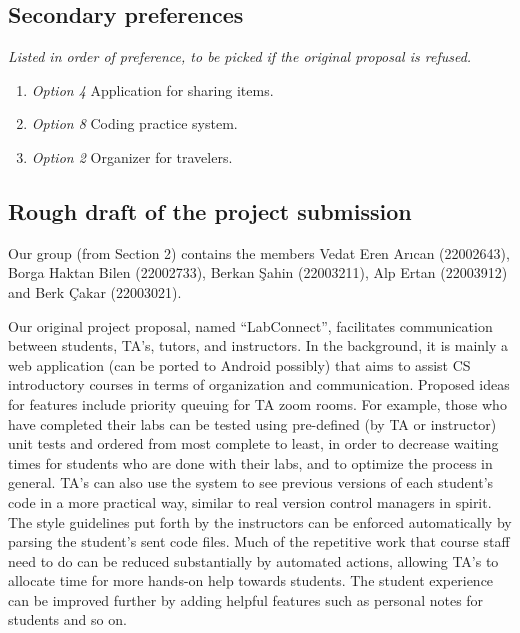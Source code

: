 \documentclass[12pt]{article}
\begin{document}
    \subsection*{Secondary preferences}\label{secondary-preferences}
    
    \textit{Listed in order of preference, to be picked if the original
    proposal is refused.}
    
    \begin{enumerate}
        \itemsep1pt\parskip0pt
        \item \textit{Option 4} \rightarrow \textnormal{Application for sharing items.}\)
        \item \textit{Option 8} \rightarrow \textnormal{Coding practice system.}\)
        \item \textit{Option 2} \rightarrow \textnormal{Organizer for travelers.}\)
    \end{enumerate}
    
    \subsection*{Rough draft of the project
    submission}\label{rough-draft-of-the-project-submission}
    
    Our group (from Section 2) contains the members Vedat Eren Arıcan
    (22002643), Borga Haktan Bilen (22002733), Berkan Şahin (22003211), Alp
    Ertan (22003912) and Berk Çakar (22003021). \newline
    
    \noindent Our original project proposal, named ``LabConnect'', facilitates
    communication between students, TA's, tutors, and instructors. In the
    background, it is mainly a web application (can be ported to Android
    possibly) that aims to assist CS introductory courses in terms of
    organization and communication. Proposed ideas for features include
    priority queuing for TA zoom rooms. For example, those who have
    completed their labs can be tested using pre-defined (by TA or
    instructor) unit tests and ordered from most complete to least, in order
    to decrease waiting times for students who are done with their labs, and
    to optimize the process in general. TA's can also use the system to see
    previous versions of each student's code in a more practical way,
    similar to real version control managers in spirit. The style guidelines
    put forth by the instructors can be enforced automatically by parsing
    the student's sent code files. Much of the repetitive work that course
    staff need to do can be reduced substantially by automated actions,
    allowing TA's to allocate time for more hands-on help towards students.
    The student experience can be improved further by adding helpful
    features such as personal notes for students and so on. \newline
    
\end{document}
